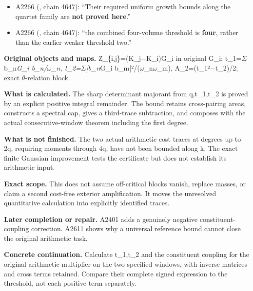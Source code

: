 \documentclass[10pt,a4paper,oneside]{report}
\providecommand{\tightlist}{\setlength{\itemsep}{0pt}\setlength{\parskip}{0pt}}
\begin{document}
\begin{itemize}
\tightlist
\item
  A2266 (\protect{}, chain
  4647): ``Their required uniform growth bounds along the quartet family
  are \textbf{not proved here}.''
\item
  A2266 (\protect{}, chain
  4647): ``the combined four-volume threshold is \textbf{four}, rather
  than the earlier weaker threshold two.''
\end{itemize}

\textbf{Original objects and maps.}
Z\_\{i,j\}=(K\_j\allowbreak{}\ensuremath{−}\allowbreak{}K\_i)G\_i in
original G\_i; t\_1=\allowbreak{}\ensuremath{Σ}\allowbreak{}
b\_n\emph{G\_i b\_n/\allowbreak{}\ensuremath{ω}\allowbreak{}\_n,
t\_2=\allowbreak{}\ensuremath{Σ}\allowbreak{}|b\_n}G\_i
b\_m|²/(\allowbreak{}\ensuremath{ω}\allowbreak{}\_n\allowbreak{}\ensuremath{ω}\allowbreak{}\_m),
A\_2=(t\_1²\allowbreak{}\ensuremath{−}\allowbreak{}t\_2)/2; exact
\allowbreak{}\ensuremath{θ}\allowbreak{}-relation block.

\textbf{What is calculated.} The sharp determinant majorant from
q,t\_1,t\_2 is proved by an explicit positive integral remainder. The
bound retains cross-pairing areas, constructs a spectral cap, gives a
third-trace subtraction, and composes with the actual consecutive-window
theorem including the first degree.

\textbf{What is not finished.} The two actual arithmetic cost traces at
degrees up to 2q, requiring moments through 4q, have not been bounded
along k. The exact finite Gaussian improvement tests the certificate but
does not establish its arithmetic input.

\textbf{Exact scope.} This does not assume off-critical blocks vanish,
replace masses, or claim a second cost-free exterior amplification. It
moves the unresolved quantitative calculation into explicitly identified
traces.

\textbf{Later completion or repair.} A2401 adds a genuinely negative
constituent-coupling correction. A2611 shows why a universal reference
bound cannot close the original arithmetic task.

\textbf{Concrete continuation.} Calculate t\_1,t\_2 and the constituent
coupling for the original arithmetic multiplier on the two specified
windows, with inverse matrices and cross terms retained. Compare their
complete signed expression to the threshold, not each positive term
separately.
\end{document}
